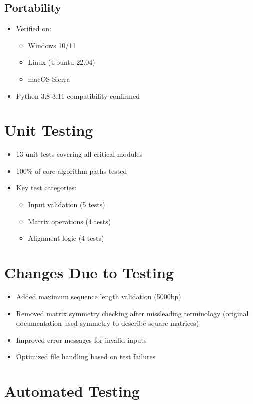 \documentclass[12pt, titlepage]{article}
\begin{document}
\subsection{Portability}
\begin{itemize}
\item Verified on:
  \begin{itemize}
  \item Windows 10/11
  \item Linux (Ubuntu 22.04)
  \item macOS Sierra
  \end{itemize}
\item Python 3.8-3.11 compatibility confirmed
\end{itemize}

\section{Unit Testing}

\begin{itemize}
\item 13 unit tests covering all critical modules
\item 100\% of core algorithm paths tested
\item Key test categories:
  \begin{itemize}
  \item Input validation (5 tests)
  \item Matrix operations (4 tests)
  \item Alignment logic (4 tests)
  \end{itemize}
\end{itemize}

\section{Changes Due to Testing}

\begin{itemize}
\item Added maximum sequence length validation (5000bp)
\item Removed matrix symmetry checking after missleading terminology (original documentation used symmetry to describe square matrices)
\item Improved error messages for invalid inputs
\item Optimized file handling based on test failures
\end{itemize}

\section{Automated Testing}
\end{document}
